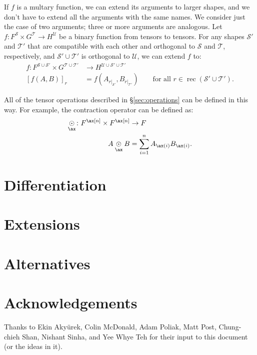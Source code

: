 \documentclass{article}
\DeclareMathOperator{\rec}{rec}
\newcommand{\restrict}[2]{\mathopen{}\left.#1\right|_{#2}}
\begin{document}
If $f$ is a multary function, we can extend its arguments to larger shapes, and we don't have to extend all the arguments with the same names. We consider just the case of two arguments; three or more arguments are analogous. Let $f \colon F^{\mathcal{S}} \times G^{\mathcal{T}} \rightarrow H^{\mathcal{U}}$ be a binary function from tensors to tensors. For any shapes $\mathcal{S'}$ and $\mathcal{T'}$ that are compatible with each other and orthogonal to $\mathcal{S}$ and $\mathcal{T}$, respectively, and $\mathcal{S'} \cup \mathcal{T'}$ is orthogonal to $\mathcal{U}$, we can extend $f$ to:
\begin{align*}
f \colon F^{\mathcal{S} \cup \mathcal{S'}} \times G^{\mathcal{T} \cup \mathcal{T'}} &\rightarrow H^{\mathcal{U} \cup \mathcal{S'} \cup \mathcal{T'}} \\
  [f(A,B)]_r &= f\left(A_{\restrict{r}{\mathcal{S'}}},B_{\restrict{r}{\mathcal{T'}}}\right) \qquad \text{for all $r \in \rec (\mathcal{S'} \cup \mathcal{T'})$.}
\end{align*}

All of the tensor operations described in \S\ref{sec:operations} can be defined in this way. For example, the contraction operator can be defined as:
\begin{align*}
  \ndot{\ax} \colon F^{\ax[n]} \times F^{\ax[n]} &\rightarrow F \\
  A \ndot{\ax} B &= \sum_{i=1}^n A_{\ax(i)} B_{\ax(i)}.
\end{align*}

\section{Differentiation}



\section{Extensions}




\section{Alternatives}



\section*{Acknowledgements}

Thanks to Ekin Aky\"{u}rek, Colin McDonald, Adam Poliak, Matt Post, Chung-chieh Shan, Nishant Sinha, and Yee Whye Teh for their input to this document (or the ideas in it).

\iffalse %
\section*{References}
\fi



\end{document}
